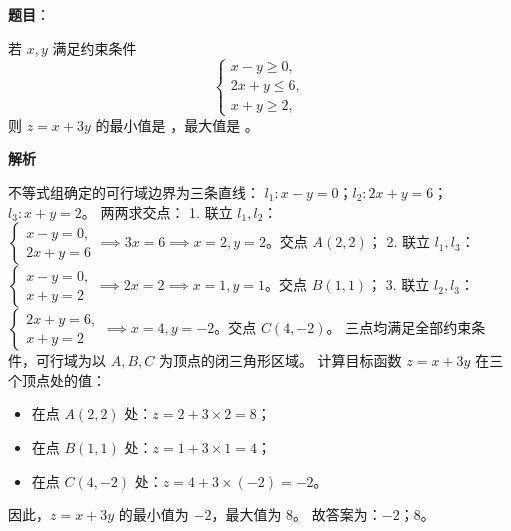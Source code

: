 \begin{answer}

\textbf{题目}：

若 $x, y$ 满足约束条件
\nopagebreak[4]
\[\begin{cases} x - y \geqslant 0, \\ 2x + y \leqslant 6, \\ x + y \geqslant 2, \end{cases}\]
则 $z = x + 3y$ 的最小值是 \underline{\hspace{2cm}}，最大值是 \underline{\hspace{2cm}}。

\textbf{解析}

不等式组确定的可行域边界为三条直线：
$l_1\colon x - y = 0$；$l_2\colon 2x + y = 6$；$l_3\colon x + y = 2$。
两两求交点：
1. 联立 $l_1, l_2$：$\begin{cases} x - y = 0, \\ 2x + y = 6 \end{cases} \implies 3x = 6 \implies x = 2, y = 2$。交点 $A(2, 2)$；
2. 联立 $l_1, l_3$：$\begin{cases} x - y = 0, \\ x + y = 2 \end{cases} \implies 2x = 2 \implies x = 1, y = 1$。交点 $B(1, 1)$；
3. 联立 $l_2, l_3$：$\begin{cases} 2x + y = 6, \\ x + y = 2 \end{cases} \implies x = 4, y = -2$。交点 $C(4, -2)$。
三点均满足全部约束条件，可行域为以 $A, B, C$ 为顶点的闭三角形区域。
计算目标函数 $z = x + 3y$ 在三个顶点处的值：
\begin{itemize}
\item 在点 $A(2, 2)$ 处：$z = 2 + 3 \times 2 = 8$；
\item 在点 $B(1, 1)$ 处：$z = 1 + 3 \times 1 = 4$；
\item 在点 $C(4, -2)$ 处：$z = 4 + 3 \times (-2) = -2$。
\end{itemize}
因此，$z = x + 3y$ 的最小值为 $-2$，最大值为 $8$。
故答案为：$-2$；$8$。


\end{answer}
